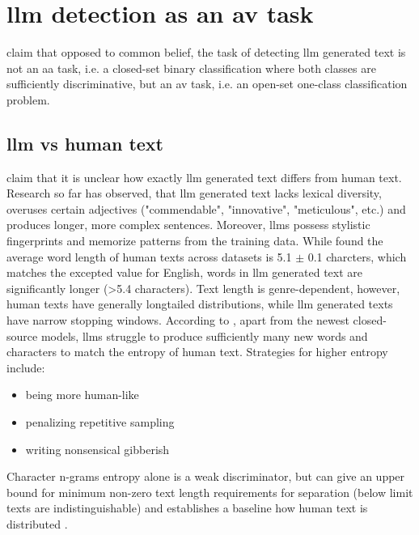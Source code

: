 \section{\ac{llm} detection as an \ac{av} task}
\label{sec:llm_detection_av}

\citet{llm_detection_av_2025} claim that opposed to common belief, the task of detecting \ac{llm} generated text is not an \ac{aa} task,
i.e. a closed-set binary classification where both classes are sufficiently discriminative, 
but an \ac{av} task, i.e. an open-set one-class classification problem. 

\subsection{\ac{llm} vs human text}

\citet{llm_detection_av_2025} claim that it is unclear how exactly \ac{llm} generated text differs from human text.
Research so far has observed, that \ac{llm} generated text lacks lexical diversity, 
overuses certain adjectives ("commendable", "innovative", "meticulous", etc.) and produces longer, more complex sentences.
Moreover, \acp{llm} possess stylistic fingerprints and memorize patterns from the training data.
While \citet{llm_detection_av_2025} found the average word length of human texts across datasets is 5.1 $\pm$ 0.1 charcters, 
which matches the excepted value for English, 
words in \ac{llm} generated text are significantly longer (>5.4 characters).
Text length is genre-dependent, however, human texts have generally longtailed distributions, 
while \ac{llm} generated texts have narrow stopping windows. 
According to \citet{llm_detection_av_2025}, apart from the newest closed-source models, 
\acp{llm} struggle to produce sufficiently many new words and characters to match the entropy of human text.
Strategies for higher entropy include:
\begin{itemize}
    \item being more human-like
    \item penalizing repetitive sampling
    \item writing nonsensical gibberish
\end{itemize}
Character n-grams entropy alone is a weak discriminator, 
but can give an upper bound for minimum non-zero text length requirements for separation (below limit texts are indistinguishable) and 
establishes a baseline how human text is distributed \citep{llm_detection_av_2025}.

